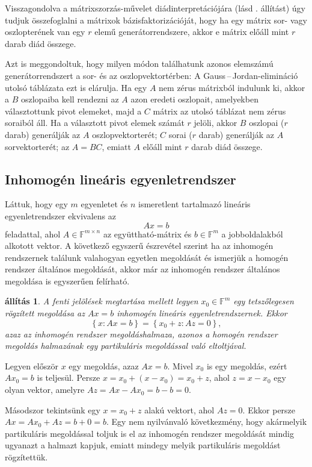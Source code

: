 \documentclass[a4paper, showtrims]{memoir}
\makeatletter
\renewenvironment{proof}[1][\proofname]
    {\par\pushQED{\qed}%
    \normalfont \topsep6\p@\@plus6\p@\relax
    \trivlist
    \item[\hskip\labelsep
        \itshape
    #1\@addpunct{:}]\ignorespaces}
    {\popQED\endtrivlist\@endpefalse}
\theoremstyle{plain}
\newtheorem{proposition}{állítás}[chapter]
\theoremstyle{remark}
\theoremstyle{definition}
\makeatother
\begin{document}
Visszagondolva a mátrixszorzás-művelet diádinterpretációjára (lásd . állítást) úgy tudjuk összefoglalni 
a mátrixok bázisfaktorizációját, hogy ha egy mátrix sor- vagy oszlopterének van egy $r$ elemű generátorrendszere,
akkor e mátrix előáll mint $r$ darab diád összege.

Azt is meggondoltuk, hogy milyen módon találhatunk azonos elemszámú generátorrendszert a sor- és az oszlopvektortérben:
A Gauss\,--\,Jordan-elimináció utolsó táblázata ezt is elárulja.
Ha egy $A$ nem zérus mátrixból indulunk ki, akkor a $B$ oszlopaiba kell rendezni az $A$ azon eredeti oszlopait,
amelyekben választottunk pivot elemeket, majd a $C$ mátrix az utolsó táblázat nem zérus soraiból áll.
Ha a választott pivot elemek számát $r$ jelöli, 
akkor $B$ oszlopai ($r$ darab) generálják az $A$ oszlopvektorterét;
$C$ sorai ($r$ darab) generálják az $A$ sorvektorterét;
az $A=BC$, emiatt $A$ előáll mint $r$ darab diád összege.

\subsection{Inhomogén lineáris egyenletrendszer}
Láttuk, hogy egy $m$ egyenletet és $n$ ismeretlent tartalmazó lineáris egyenletrendszer ekvivalens az
\[
	Ax=b
\]
feladattal, ahol $A\in\mathbb{F}^{m\times n}$ az együttható-mátrix és $b\in\mathbb{F}^m$
a jobboldalakból alkotott vektor.
A következő egyszerű észrevétel szerint ha az inhomogén rendszernek találunk valahogyan egyetlen megoldását és ismerjük a homogén rendszer általános megoldását,
akkor már az inhomogén rendszer általános megoldása is egyszerűen felírható.
\begin{proposition}
	A fenti jelölések megtartása mellett
	legyen $x_0\in\mathbb{F}^m$ egy tetszőlegesen rögzített megoldása az $Ax=b$ inhomogén lineáris egyenletrendszernek.
	Ekkor
	\[
		\left\{ x:Ax=b \right\}
		=
		\left\{ x_0+z:Az=0 \right\},
	\]
	azaz az inhomogén rendszer megoldáshalmaza,
	azonos a homogén rendszer megoldás halmazának egy partikuláris megoldással való
	eltoltjával.
\end{proposition}
\begin{proof}
	Legyen először $x$ egy megoldás, azaz $Ax=b$.
	Mivel $x_0$ is egy megoldás, ezért $Ax_{0}=b$ is teljesül.
	Persze $x=x_0+\left( x-x_0 \right)=x_0+z$, ahol $z=x-x_0$ egy olyan vektor,
	amelyre $Az=Ax-Ax_0=b-b=0$.

	Másodszor tekintsünk egy $x=x_0+z$ alakú vektort, ahol $Az=0$.
	Ekkor persze $Ax=Ax_0+Az=b+0=b$.
\end{proof}
Egy nem nyilvánvaló következmény,
hogy akármelyik partikuláris megoldással toljuk is el az
inhomogén rendszer megoldását mindig ugyanazt a halmazt kapjuk,
emiatt mindegy melyik partikuláris megoldást rögzítettük.
\end{document}
